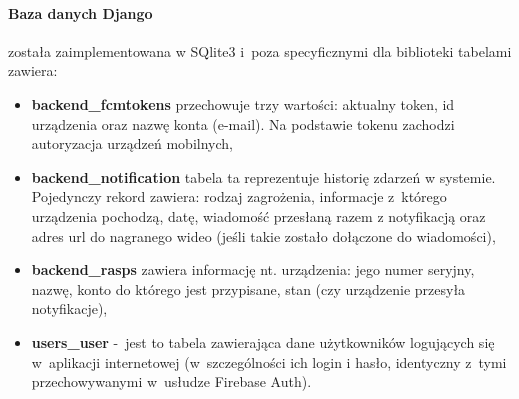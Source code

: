 \paragraph{Baza danych Django} została zaimplementowana w SQlite3 i~poza specyficznymi dla biblioteki tabelami zawiera:
\begin{itemize}
	\item \textbf{backend\_fcmtokens} przechowuje trzy wartości: aktualny token, id urządzenia oraz nazwę konta (e-mail). Na podstawie tokenu zachodzi autoryzacja urządzeń mobilnych,
	\item \textbf{backend\_notification} tabela ta reprezentuje historię zdarzeń w systemie. Pojedynczy rekord zawiera: rodzaj zagrożenia, informacje z~którego urządzenia pochodzą, datę, wiadomość przesłaną razem z notyfikacją oraz adres url do nagranego wideo (jeśli takie zostało dołączone do wiadomości),
	\item \textbf{backend\_rasps} zawiera informację nt. urządzenia: jego numer seryjny, nazwę, konto do którego jest przypisane, stan (czy urządzenie przesyła notyfikacje),
	\item \textbf{users\_user} -~jest to tabela zawierająca dane użytkowników logujących się w~aplikacji internetowej (w~szczególności ich login i hasło, identyczny z~tymi przechowywanymi w~usłudze Firebase Auth).
\end{itemize}
